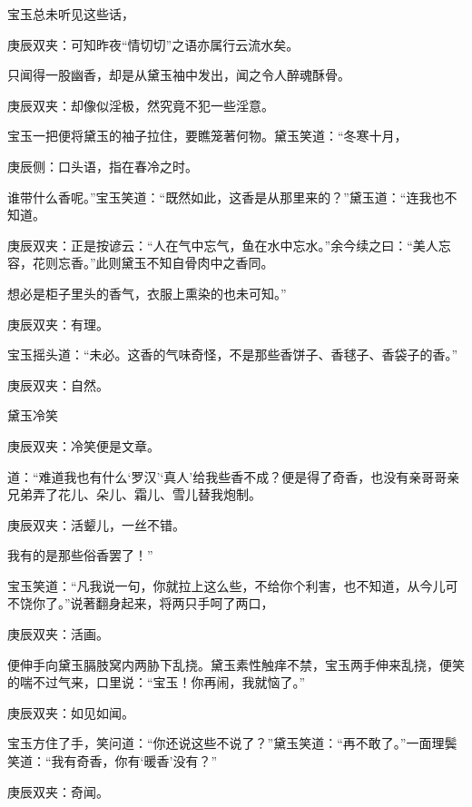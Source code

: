 \begin{parag}
    宝玉总未听见这些话，\begin{note}庚辰双夹：可知昨夜“情切切”之语亦属行云流水矣。\end{note}只闻得一股幽香，却是从黛玉袖中发出，闻之令人醉魂酥骨。\begin{note}庚辰双夹：却像似淫极，然究竟不犯一些淫意。\end{note}宝玉一把便将黛玉的袖子拉住，要瞧笼著何物。黛玉笑道：“冬寒十月，\begin{note}庚辰侧：口头语，指在春冷之时。\end{note}谁带什么香呢。”宝玉笑道：“既然如此，这香是从那里来的？”黛玉道：“连我也不知道。\begin{note}庚辰双夹：正是按谚云：“人在气中忘气，鱼在水中忘水。”余今续之曰：“美人忘容，花则忘香。”此则黛玉不知自骨肉中之香同。\end{note}想必是柜子里头的香气，衣服上熏染的也未可知。”\begin{note}庚辰双夹：有理。\end{note}宝玉摇头道：“未必。这香的气味奇怪，不是那些香饼子、香毬子、香袋子的香。”\begin{note}庚辰双夹：自然。\end{note}黛玉冷笑\begin{note}庚辰双夹：冷笑便是文章。\end{note}道：“难道我也有什么‘罗汉’‘真人’给我些香不成？便是得了奇香，也没有亲哥哥亲兄弟弄了花儿、朵儿、霜儿、雪儿替我炮制。\begin{note}庚辰双夹：活颦儿，一丝不错。\end{note}我有的是那些俗香罢了！”
\end{parag}


\begin{parag}
    宝玉笑道：“凡我说一句，你就拉上这么些，不给你个利害，也不知道，从今儿可不饶你了。”说著翻身起来，将两只手呵了两口，\begin{note}庚辰双夹：活画。\end{note}便伸手向黛玉膈肢窝内两胁下乱挠。黛玉素性触痒不禁，宝玉两手伸来乱挠，便笑的喘不过气来，口里说：“宝玉！你再闹，我就恼了。”\begin{note}庚辰双夹：如见如闻。\end{note}宝玉方住了手，笑问道：“你还说这些不说了？”黛玉笑道：“再不敢了。”一面理鬓笑道：“我有奇香，你有‘暖香’没有？”\begin{note}庚辰双夹：奇闻。\end{note}
\end{parag}


